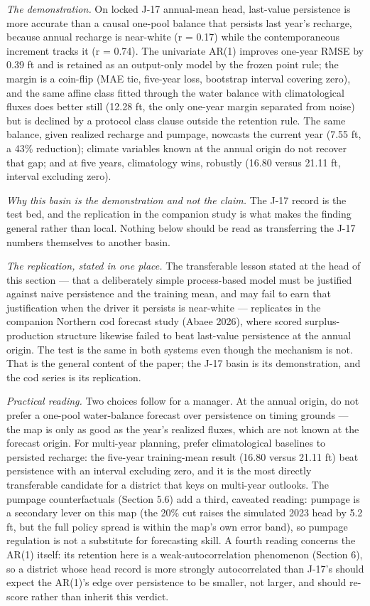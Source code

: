 \documentclass[11pt]{article}
\begin{document}
\emph{The demonstration.} On locked J-17 annual-mean head, last-value persistence is more accurate
than a causal one-pool balance that persists last year's recharge, because annual recharge is
near-white (r = 0.17) while the contemporaneous increment tracks it (r = 0.74). The univariate
AR(1) improves one-year RMSE by 0.39 ft and is retained as an output-only model by the frozen point
rule; the margin is a coin-flip (MAE tie, five-year loss, bootstrap interval covering zero), and the
same affine class fitted through the water balance with climatological fluxes does better still
(12.28 ft, the only one-year margin separated from noise) but is declined by a protocol class clause
outside the retention rule. The same balance, given realized recharge and pumpage, nowcasts the
current year (7.55 ft, a 43\% reduction); climate variables known at the annual origin do not
recover that gap; and at five years, climatology wins, robustly (16.80 versus 21.11 ft, interval
excluding zero).

\emph{Why this basin is the demonstration and not the claim.} The J-17 record is the test bed, and
the replication in the companion study is what makes the finding general rather than local. Nothing
below should be read as transferring the J-17 numbers themselves to another basin.


\emph{The replication, stated in one place.} The transferable lesson stated at the head of this section --- that a deliberately simple process-based model must be justified against naive persistence and the training mean, and may fail to earn that justification when the driver it persists is near-white --- replicates in the companion Northern cod forecast study (Abaee 2026), where scored surplus-production structure likewise failed to beat last-value persistence at the annual origin. The test is the same in both systems even though the mechanism is not. That is the general content of the paper; the J-17 basin is its demonstration, and the cod series is its replication.

\emph{Practical reading.} Two choices follow for a manager. At the
annual origin, do not prefer a one-pool water-balance forecast over
persistence on timing grounds --- the map is only as good as the year's
realized fluxes, which are not known at the forecast origin. For
multi-year planning, prefer climatological baselines to persisted
recharge: the five-year training-mean result (16.80 versus 21.11 ft)
beat persistence with an interval excluding zero, and it is the most
directly transferable candidate for a district that keys on multi-year
outlooks. The pumpage counterfactuals (Section 5.6) add a third,
caveated reading: pumpage is a secondary lever on this map (the 20\% cut
raises the simulated 2023 head by 5.2 ft, but the full policy spread is
within the map's own error band), so pumpage regulation is not a
substitute for forecasting skill. A fourth reading concerns the AR(1)
itself: its retention here is a weak-autocorrelation phenomenon (Section
6), so a district whose head record is more strongly autocorrelated than
J-17's should expect the AR(1)'s edge over persistence to be smaller,
not larger, and should re-score rather than inherit this verdict.
\end{document}
